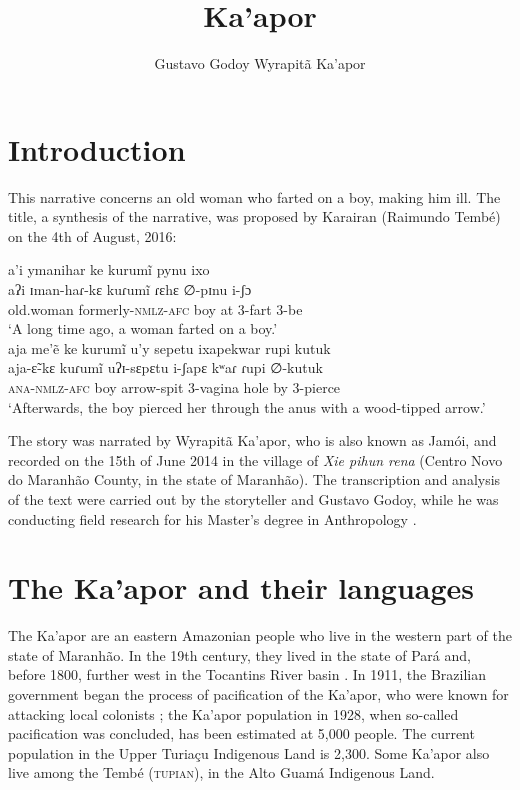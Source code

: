 \documentclass[output=paper,
modfonts,nonflat
]{langsci/langscibook}
\author{Gustavo Godoy\affiliation{PPGAS-Museu Nacional, UFRJ}%
\lastand Wyrapitã Ka'apor%
}%
\title{Ka'apor}
\begin{document}
\section{Introduction} 


	This narrative concerns an old woman who farted on a boy, making him ill. The title, a synthesis of the narrative, was proposed by Karairan (Raimundo Tembé) on the 4th of August, 2016:
    
\ea a'i ymanihar ke kurumĩ pynu ixo \\[.3em]
\gll aʔi		ɪman-haɾ-kɛ	kuɾumĩ	ɾɛhɛ	∅-pɪnu	i-ʃɔ \\
old.woman	formerly\textsc{-nmlz}\textsc{-afc}	boy	at	3-fart	3-be \\
\glt ‘A long time ago, a woman farted on a boy.’ \\
\z
\ea aja me'ẽ ke kurumĩ u'y sepetu ixapekwar rupi kutuk \\[.3em]
\gll aja-ɛ̃-kɛ	kuɾumĩ		uʔɪ-sɛpɛtu	i-ʃapɛ	  kʷaɾ	ɾupi	∅-kutuk \\
\textsc{ana}\textsc{-nmlz}\textsc{-afc}	boy		arrow-spit	3-vagina	  hole	by	3-pierce \\
\glt ‘Afterwards, the boy pierced her through the anus with a wood-tipped arrow.’ \\
\z

	The story was narrated by Wyrapitã Ka’apor, who is also known as Jamói, and recorded on the 15th of June 2014 in the village of \emph{Xie pihun rena} (Centro Novo do Maranhão County, in the state of Maranhão). The transcription and analysis of the text were carried out by the storyteller and Gustavo Godoy, while he was conducting field research for his Master’s degree in Anthropology \citep{Godoy2015}.



\section{The Ka’apor and their languages}
	The Ka’apor are an eastern Amazonian people who live in the western part of the state of Maranhão. In the 19th century, they lived in the state of Pará and, before 1800, further west in the Tocantins River basin \citep[30--32]{Balée1994}. In 1911, the Brazilian government began the process of pacification of the Ka’apor, who were known for attacking local colonists \citep{Ribeiro1962}; the Ka’apor population in 1928, when so-called pacification was concluded, has been estimated at 5,000 people. The current population in the Upper Turiaçu Indigenous Land is 2,300. Some Ka’apor also live among the Tembé (\textsc{tupian}), in the Alto Guamá Indigenous Land.
    
\end{document}
